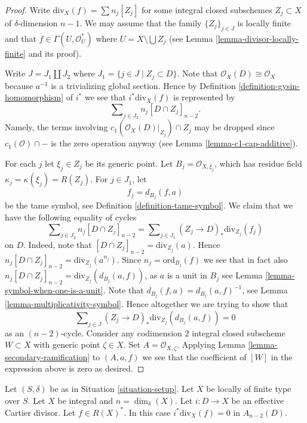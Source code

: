 \begin{proof}
Write $\text{div}_X(f) = \sum n_j[Z_j]$ for some integral
closed subschemes $Z_j \subset X$ of $\delta$-dimension $n - 1$.
We may assume that the family $\{Z_j\}_{j \in J}$ is locally
finite and that $f \in \Gamma(U, \mathcal{O}_U^*)$
where $U = X \setminus \bigcup Z_j$ (see
Lemma \ref{lemma-divisor-locally-finite} and its proof).

\medskip\noindent
Write $J = J_1 \coprod J_2$ where $J_1 = \{j \in J \mid Z_j \subset D\}$.
Note that $\mathcal{O}_X(D) \cong \mathcal{O}_X$ because
$a^{-1}$ is a trivializing global section. Hence by
Definition \ref{definition-gysin-homomorphism}
of $i^*$ we see that $i^*\text{div}_X(f)$ is represented
by
$$
\sum\nolimits_{j \in J_2} n_j[D \cap Z_j]_{n - 2}.
$$
Namely, the terms involving $c_1(\mathcal{O}_X(D)|_{Z_j}) \cap Z_j$
may be dropped since $c_1(\mathcal{O}) \cap -$ is the zero
operation anyway (see Lemma \ref{lemma-c1-cap-additive}).

\medskip\noindent
For each $j$ let $\xi_j \in Z_j$ be its generic point.
Let $B_j = \mathcal{O}_{X, \xi_j}$, which has
residue field $\kappa_j = \kappa(\xi_j) = R(Z_j)$.
For $j \in J_1$, let
$$
f_j = d_{B_j}(f, a)
$$
be the tame symbol, see Definition \ref{definition-tame-symbol}.
We claim that we have the following equality of cycles
$$
\sum\nolimits_{j \in J_2} n_j[D \cap Z_j]_{n - 2}
=
\sum\nolimits_{j \in J_1}
(Z_j \to D)_*\text{div}_{Z_j}(f_j)
$$
on $D$. Indeed, note that $[D \cap Z_j]_{n - 2} = \text{div}_{Z_j}(a)$.
Hence $n_j[D \cap Z_j]_{n - 2} = \text{div}_{Z_j}(a^{n_j})$.
Since $n_j = \text{ord}_{B_j}(f)$ we see that in fact also
$n_j[D \cap Z_j]_{n - 2} = \text{div}_{Z_j}(d_{B_j}(a, f))$,
as $a$ is a unit in $B_j$ see Lemma \ref{lemma-symbol-when-one-is-a-unit}.
Note that $d_{B_j}(f, a) = d_{B_j}(a, f)^{-1}$, see
Lemma \ref{lemma-multiplicativity-symbol}.
Hence altogether we are trying to show that
$$
\sum\nolimits_{j \in J}
(Z_j \to D)_*\text{div}_{Z_j}(d_{B_j}(a, f))
=
0
$$
as an $(n - 2)$-cycle. Consider any codimension $2$
integral closed subscheme $W \subset X$ with generic point $\zeta \in X$.
Set $A = \mathcal{O}_{X, \zeta}$. Applying
Lemma \ref{lemma-secondary-ramification} to
$(A, a, f)$ we see that the coefficient of $[W]$ in the expression
above is zero as desired.
\end{proof}

\begin{lemma}
\label{lemma-gysin-factors-general}
Let $(S, \delta)$ be as in Situation \ref{situation-setup}.
Let $X$ be locally of finite type over $S$.
Let $X$ be integral and $n = \dim_\delta(X)$.
Let $i : D \to X$ be an effective Cartier divisor.
Let $f \in R(X)^*$.
In this case $i^*\text{div}_X(f) = 0$ in $A_{n - 2}(D)$.
\end{lemma}

